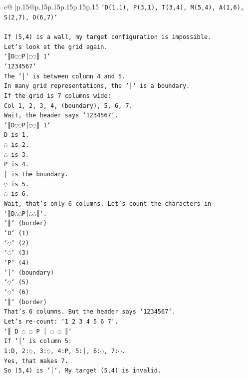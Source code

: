 \documentclass{article}
\begin{document}
{\begin{supertabular}{c@{$\;$}|p{.15\linewidth}@{}p{.15\linewidth}p{.15\linewidth}p{.15\linewidth}p{.15\linewidth}p{.15\linewidth}}
{{{\texttt{`D(1,1), P(3,1), T(3,4), M(5,4), A(1,6), S(2,7), O(6,7)`} \\
\\ 
\texttt{If (5,4) is a wall, my target configuration is impossible.} \\
\texttt{Let's look at the grid again.} \\
\texttt{`║D◌◌P│◌◌║ 1`} \\
\texttt{`1234567`} \\
\texttt{The `│` is between column 4 and 5.} \\
\texttt{In many grid representations, the `│` is a boundary.} \\
\texttt{If the grid is 7 columns wide:} \\
\texttt{Col 1, 2, 3, 4, (boundary), 5, 6, 7.} \\
\texttt{Wait, the header says `1234567`.} \\
\texttt{`║D◌◌P│◌◌║ 1`} \\
\texttt{D is 1.} \\
\texttt{◌ is 2.} \\
\texttt{◌ is 3.} \\
\texttt{P is 4.} \\
\texttt{│ is the boundary.} \\
\texttt{◌ is 5.} \\
\texttt{◌ is 6.} \\
\texttt{Wait, that's only 6 columns. Let's count the characters in `║D◌◌P│◌◌║`.} \\
\texttt{`║` (border)} \\
\texttt{`D` (1)} \\
\texttt{`◌` (2)} \\
\texttt{`◌` (3)} \\
\texttt{`P` (4)} \\
\texttt{`│` (boundary)} \\
\texttt{`◌` (5)} \\
\texttt{`◌` (6)} \\
\texttt{`║` (border)} \\
\texttt{That's 6 columns. But the header says `1234567`.} \\
\texttt{Let's re{-}count: `1 2 3 4 5 6 7`.} \\
\texttt{`║ D ◌ ◌ P │ ◌ ◌ ║`} \\
\texttt{If `│` is column 5:} \\
\texttt{1:D, 2:◌, 3:◌, 4:P, 5:│, 6:◌, 7:◌.} \\
\texttt{Yes, that makes 7.} \\
\texttt{So (5,4) is `│`. My target (5,4) is invalid.} \\
}}}
\end{supertabular}}
\end{document}
